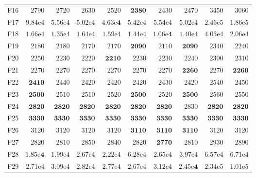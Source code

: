 \begin{tabular}{lrrrrrrrrr}
F16 & $2790$ & $2720$ & $2630$ & $2520$ & $\mathbf{2380}$ & $2430$ & $2470$ & $3450$ & $3060$ \\
F17 & $9.84\mathrm{e}{4}$ & $5.56\mathrm{e}{4}$ & $5.02\mathrm{e}{4}$ & $\mathbf{4.63\mathrm{e}{4}}$ & $5.42\mathrm{e}{4}$ & $5.54\mathrm{e}{4}$ & $5.02\mathrm{e}{4}$ & $2.46\mathrm{e}{5}$ & $1.86\mathrm{e}{5}$ \\
F18 & $1.66\mathrm{e}{4}$ & $1.35\mathrm{e}{4}$ & $1.64\mathrm{e}{4}$ & $1.59\mathrm{e}{4}$ & $1.44\mathrm{e}{4}$ & $\mathbf{1.06\mathrm{e}{4}}$ & $1.40\mathrm{e}{4}$ & $4.03\mathrm{e}{4}$ & $2.06\mathrm{e}{4}$ \\
F19 & $2180$ & $2180$ & $2170$ & $2170$ & $\mathbf{2090}$ & $2110$ & $\mathbf{2090}$ & $2340$ & $2240$ \\
F20 & $2250$ & $2230$ & $2220$ & $\mathbf{2210}$ & $2230$ & $2230$ & $2240$ & $2300$ & $2310$ \\
F21 & $2270$ & $2270$ & $2270$ & $2270$ & $2270$ & $2270$ & $\mathbf{2260}$ & $2270$ & $\mathbf{2260}$ \\
F22 & $\mathbf{2410}$ & $2440$ & $2420$ & $2420$ & $2420$ & $2430$ & $2420$ & $2540$ & $2450$ \\
F23 & $\mathbf{2500}$ & $2510$ & $2510$ & $2520$ & $\mathbf{2500}$ & $2520$ & $\mathbf{2500}$ & $2560$ & $2550$ \\
F24 & $\mathbf{2820}$ & $\mathbf{2820}$ & $\mathbf{2820}$ & $\mathbf{2820}$ & $\mathbf{2820}$ & $\mathbf{2820}$ & $2830$ & $\mathbf{2820}$ & $\mathbf{2820}$ \\
F25 & $\mathbf{3330}$ & $\mathbf{3330}$ & $\mathbf{3330}$ & $\mathbf{3330}$ & $\mathbf{3330}$ & $\mathbf{3330}$ & $\mathbf{3330}$ & $\mathbf{3330}$ & $\mathbf{3330}$ \\
F26 & $3120$ & $3120$ & $3120$ & $3120$ & $\mathbf{3110}$ & $\mathbf{3110}$ & $\mathbf{3110}$ & $3120$ & $3120$ \\
F27 & $2820$ & $2810$ & $2850$ & $2840$ & $2820$ & $\mathbf{2770}$ & $2810$ & $2930$ & $2890$ \\
F28 & $\mathbf{1.85\mathrm{e}{4}}$ & $1.99\mathrm{e}{4}$ & $2.67\mathrm{e}{4}$ & $2.22\mathrm{e}{4}$ & $6.28\mathrm{e}{4}$ & $2.65\mathrm{e}{4}$ & $3.97\mathrm{e}{4}$ & $6.57\mathrm{e}{4}$ & $6.71\mathrm{e}{4}$ \\
F29 & $2.71\mathrm{e}{4}$ & $3.09\mathrm{e}{4}$ & $2.82\mathrm{e}{4}$ & $2.77\mathrm{e}{4}$ & $2.67\mathrm{e}{4}$ & $3.12\mathrm{e}{4}$ & $\mathbf{2.45\mathrm{e}{4}}$ & $2.34\mathrm{e}{5}$ & $1.01\mathrm{e}{5}$ \\
\bottomrule
\end{tabular}
